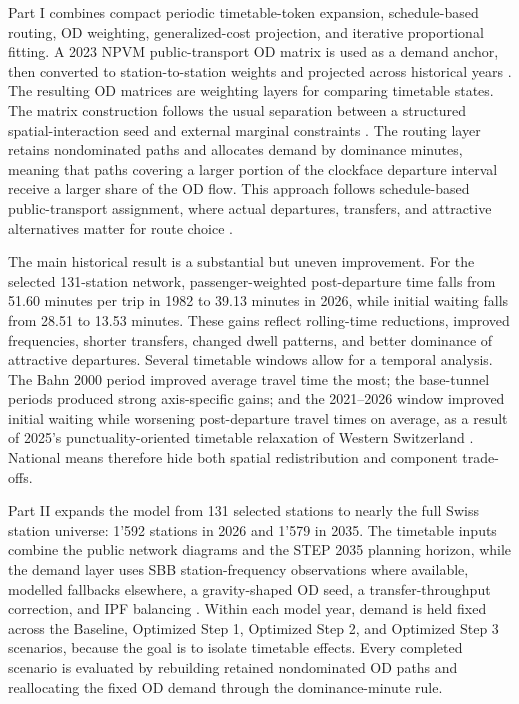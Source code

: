 \documentclass[10pt,a4paper]{article}
\begin{document}
Part I combines compact periodic timetable-token expansion, schedule-based routing, OD weighting, generalized-cost projection, and iterative proportional fitting. A 2023 NPVM public-transport OD matrix is used as a demand anchor, then converted to station-to-station weights and projected across historical years \citep{vmuvek2026npvm2023}. The resulting OD matrices are weighting layers for comparing timetable states. The matrix construction follows the usual separation between a structured spatial-interaction seed and external marginal constraints \citep{wilson1970entropy,demingStephan1940IPF,fienberg1970IPF}. The routing layer retains nondominated paths and allocates demand by dominance minutes, meaning that paths covering a larger portion of the clockface departure interval receive a larger share of the OD flow. This approach follows schedule-based public-transport assignment, where actual departures, transfers, and attractive alternatives matter for route choice \citep{spiessFlorian1989OptimalStrategies,nuzzoloRussoCrisalli2001ScheduleAssignment}.

The main historical result is a substantial but uneven improvement. For the selected 131-station network, passenger-weighted post-departure time falls from 51.60 minutes per trip in 1982 to 39.13 minutes in 2026, while initial waiting falls from 28.51 to 13.53 minutes. These gains reflect rolling-time reductions, improved frequencies, shorter transfers, changed dwell patterns, and better dominance of attractive departures. Several timetable windows allow for a temporal analysis. The Bahn 2000 period improved average travel time the most; the base-tunnel periods produced strong axis-specific gains; and the 2021--2026 window improved initial waiting while worsening post-departure travel times on average, as a result of 2025's punctuality-oriented timetable relaxation of Western Switzerland \citep{sbbRomandie2025Punctuality}. National means therefore hide both spatial redistribution and component trade-offs.

Part II expands the model from 131 selected stations to nearly the full Swiss station universe: 1'592 stations in 2026 and 1'579 in 2035. The timetable inputs combine the public network diagrams and the STEP 2035 planning horizon, while the demand layer uses SBB station-frequency observations where available, modelled fallbacks elsewhere, a gravity-shaped OD seed, a transfer-throughput correction, and IPF balancing \citep{smaPartnerDownloads,bav2021as2035,sbbPassagierfrequenzDataset2026}. Within each model year, demand is held fixed across the Baseline, Optimized Step 1, Optimized Step 2, and Optimized Step 3 scenarios, because the goal is to isolate timetable effects. Every completed scenario is evaluated by rebuilding retained nondominated OD paths and reallocating the fixed OD demand through the dominance-minute rule.
\end{document}
